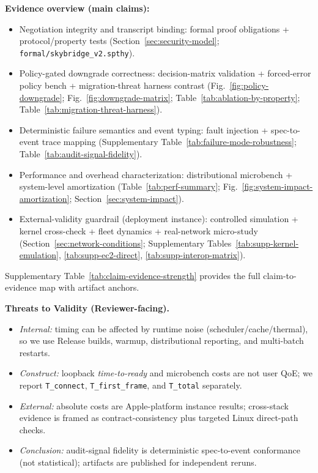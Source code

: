 \documentclass[10pt,journal,compsoc]{IEEEtran}
\providecommand{\tightlist}{%
  \setlength{\itemsep}{0pt}\setlength{\parskip}{0pt}}
\begin{document}
\textbf{Evidence overview (main claims):}
\begin{itemize}\tightlist
\item Negotiation integrity and transcript binding: formal proof obligations + protocol/property tests (Section~\ref{sec:security-model}; \texttt{formal/skybridge\_v2.spthy}).
\item Policy-gated downgrade correctness: decision-matrix validation + forced-error policy bench + migration-threat harness contrast (Fig.~\ref{fig:policy-downgrade}; Fig.~\ref{fig:downgrade-matrix}; Table~\ref{tab:ablation-by-property}; Table~\ref{tab:migration-threat-harness}).
\item Deterministic failure semantics and event typing: fault injection + spec-to-event trace mapping (Supplementary Table~\ref{tab:failure-mode-robustness}; Table~\ref{tab:audit-signal-fidelity}).
\item Performance and overhead characterization: distributional microbench + system-level amortization (Table~\ref{tab:perf-summary}; Fig.~\ref{fig:system-impact-amortization}; Section~\ref{sec:system-impact}).
\item External-validity guardrail (deployment instance): controlled simulation + kernel cross-check + fleet dynamics + real-network micro-study (Section~\ref{sec:network-conditions}; Supplementary Tables~\ref{tab:supp-kernel-emulation}, \ref{tab:supp-ec2-direct}, \ref{tab:supp-interop-matrix}).
\end{itemize}
Supplementary Table~\ref{tab:claim-evidence-strength} provides the full claim-to-evidence map with artifact anchors.

\textbf{Threats to Validity (Reviewer-facing).}
\begin{itemize}\tightlist
\item \emph{Internal:} timing can be affected by runtime noise (scheduler/cache/thermal), so we use Release builds, warmup, distributional reporting, and multi-batch restarts.
\item \emph{Construct:} loopback \emph{time-to-ready} and microbench costs are not user QoE; we report \texttt{T\_connect}, \texttt{T\_first\_frame}, and \texttt{T\_total} separately.
\item \emph{External:} absolute costs are Apple-platform instance results; cross-stack evidence is framed as contract-consistency plus targeted Linux direct-path checks.
\item \emph{Conclusion:} audit-signal fidelity is deterministic spec-to-event conformance (not statistical); artifacts are published for independent reruns.
\end{itemize}
\end{document}

